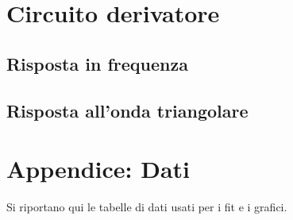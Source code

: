 \documentclass[10pt,a4paper]{article}
\begin{document}
\section{Circuito derivatore}

\subsection{Risposta in frequenza}

\subsection{Risposta all'onda triangolare}

\pagebreak
\section{Appendice: Dati}
Si riportano qui le tabelle di dati usati per i fit e i grafici.

\begin{figure}[h!]
	\centering
	\resizebox{0.7\textwidth}{!}{
	}
	\label{tab:lowpass}
\end{figure}

\begin{figure}[h!]
	\centering
	\resizebox{0.7\textwidth}{!}{
	}
	\label{tab:highpass}
\end{figure}

\end{document}
